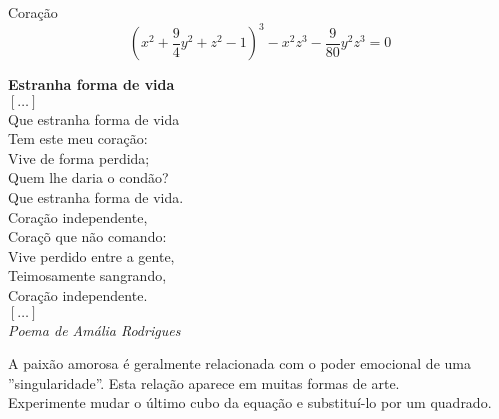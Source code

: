 \begin{surferPage}{Coração}
\smallskip
\[(x^2+ \frac{9}{4}y^2+ z^2- 1)^3- x^2z^3	-  \frac{9}{80}y^2z^3	= 0\]

\singlespacing
{\bf Estranha forma de vida}\\
$[\ldots]$\\
Que estranha forma de vida\\
Tem este meu cora\c c\~ao:\\
Vive de forma perdida;\\
Quem lhe daria o cond\~ao?\\
Que estranha forma de vida.\\
\singlespacing
Cora\c c\~ao independente,\\
Cora\c c\~o que n\~ao comando:\\
Vive perdido entre a gente,\\
Teimosamente sangrando,\\
Cora\c c\~ao independente.\\
$[\ldots]$\\
{\it Poema de Am\'alia Rodrigues}

\singlespacing 
A paix\~ao amorosa \'e geralmente relacionada com o poder emocional de uma ''singularidade''. Esta rela\c c\~ao aparece em muitas formas de arte. \\
Experimente  mudar o \'ultimo cubo da equa\c c\~ao e substitu\'i-lo por um quadrado.
\end{surferPage}
